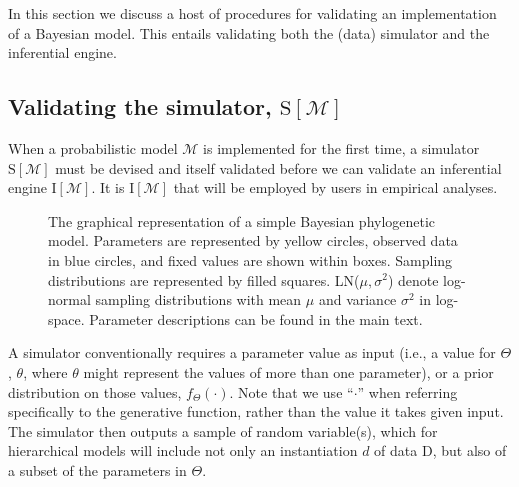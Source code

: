 \documentclass[oneside]{article}
\begin{document}
In this section we discuss a host of procedures for validating an implementation of a Bayesian model.
This entails validating both the (data) simulator and the inferential engine.

\subsection*{Validating the simulator, $\text{S}[\mathcal{M}]$}
\label{verify-correctness-of-simulator-implementation}

When a probabilistic model $\mathcal{M}$ is implemented for the first time, a simulator $\text{S}[\mathcal{M}]$ must be devised and itself validated before we can validate an inferential engine $\text{I}[\mathcal{M}]$.
It is $\text{I}[\mathcal{M}]$ that will be employed by users in empirical analyses.
\begin{figure}%
  \centering
      
  \caption{
    The graphical representation of a simple Bayesian phylogenetic model.
    Parameters are represented by yellow circles, observed data in blue circles, and fixed values are shown within boxes.
    Sampling distributions are represented by filled squares.
    LN($\mu,\sigma^2$) denote log-normal sampling distributions with mean $\mu$ and variance $\sigma^2$ in log-space.
    Parameter descriptions can be found in the main text.
    }
  \label{fig:pgm}
  
\end{figure}
A simulator conventionally requires a parameter value as input (i.e., a value for $\Theta$, $\theta$, where $\theta$ might represent the values of more than one parameter), or a prior distribution on those values, $f_\Theta(\cdot)$. 
Note that we use ``$\cdot$'' when referring specifically to the generative function, rather than the value it takes given input.
The simulator then outputs a sample of random variable(s), which for hierarchical models will include not only an instantiation $d$ of data $\text{D}$, but also of a subset of the parameters in $\Theta$.
 
\end{document}
